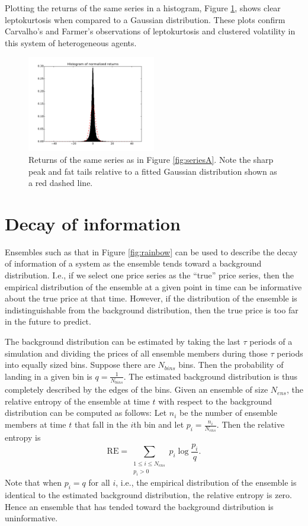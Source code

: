 \documentclass{article}
\begin{document}
Plotting the returns of the same series in a histogram, Figure \ref{fig:seriesA_hist}, shows clear leptokurtosis when compared to a Gaussian distribution. These plots confirm Carvalho's and Farmer's observations of leptokurtosis and clustered volatility in this system of heterogeneous agents.

\begin{figure}
  \centering
  \vspace{-40pt}
  \includegraphics[width=0.5\textwidth]{images/seriesA_histogram.pdf}
  \caption{Returns of the same series as in Figure \ref{fig:seriesA}. Note the sharp peak and fat tails relative to a fitted Gaussian distribution shown as a red dashed line.}
  \label{fig:seriesA_hist}
\end{figure}

\section{Decay of information}

Ensembles such as that in Figure \ref{fig:rainbow} can be used to describe the decay of information of a system as the ensemble tends toward a background distribution. I.e., if we select one price series as the ``true'' price series, then the empirical distribution of the ensemble at a given point in time can be informative about the true price at that time. However, if the distribution of the ensemble is indistinguishable from the background distribution, then the true price is too far in the future to predict.

The background distribution can be estimated by taking the last $\tau$ periods of a simulation and dividing the prices of all ensemble members during those $\tau$ periods into equally sized bins. Suppose there are $N_{bins}$ bins. Then the probability of landing in a given bin is $q=\frac{1}{N_{bins}}$. The estimated background distribution is thus completely described by the edges of the bins. Given an ensemble of size $N_{ens}$, the relative entropy of the ensemble at time $t$ with respect to the background distribution can be computed as follows: Let $n_i$ be the number of ensemble members at time $t$ that fall in the $i$th bin and let $p_i=\frac{n_i}{N_{ens}}$. Then the relative entropy is
$$\mathrm{RE}=\sum_{\substack{1\le i\le N_{ens}\\p_i>0}}p_i\log\frac{p_i}{q}.$$
Note that when $p_i=q$ for all $i$, i.e., the empirical distribution of the ensemble is identical to the estimated background distribution, the relative entropy is zero. Hence an ensemble that has tended toward the background distribution is uninformative.
\end{document}
